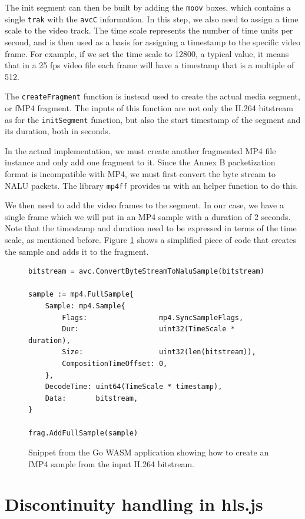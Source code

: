 The init segment can then be built by adding the \texttt{moov} boxes, which contains a single \texttt{trak} with the \texttt{avcC} information. In this step, we also need to assign a time scale to the video track. The time scale represents the number of time units per second, and is then used as a basis for assigning a timestamp to the specific video frame. For example, if we set the time scale to 12800, a typical value, it means that in a 25 fps video file each frame will have a timestamp that is a multiple of 512.

The \texttt{createFragment} function is instead used to create the actual media segment, or fMP4 fragment. The inputs of this function are not only the H.264 bitstream as for the \texttt{initSegment} function, but also the start timestamp of the segment and its duration, both in seconds.

In the actual implementation, we must create another fragmented MP4 file instance and only add one fragment to it. Since the Annex B packetization format is incompatible with MP4, we must first convert the byte stream to NALU packets. The library \texttt{mp4ff} provides us with an helper function to do this.

We then need to add the video frames to the segment. In our case, we have a single frame which we will put in an MP4 sample with a duration of 2 seconds. Note that the timestamp and duration need to be expressed in terms of the time scale, as mentioned before. Figure \ref{fig:wasm_go_fragment} shows a simplified piece of code that creates the sample and adds it to the fragment.

\begin{figure}[h]
    \centering
    \begin{verbatim}
bitstream = avc.ConvertByteStreamToNaluSample(bitstream)

sample := mp4.FullSample{
	Sample: mp4.Sample{
		Flags:                 mp4.SyncSampleFlags,
		Dur:                   uint32(TimeScale * duration),
		Size:                  uint32(len(bitstream)),
		CompositionTimeOffset: 0,
	},
	DecodeTime: uint64(TimeScale * timestamp),
	Data:       bitstream,
}

frag.AddFullSample(sample)
    \end{verbatim}
    \caption{Snippet from the Go WASM application showing how to create an fMP4 sample from the input H.264 bitstream.}
    \label{fig:wasm_go_fragment}
\end{figure}

\section{Discontinuity handling in hls.js}
\label{sec:improvements/discontinuities}

